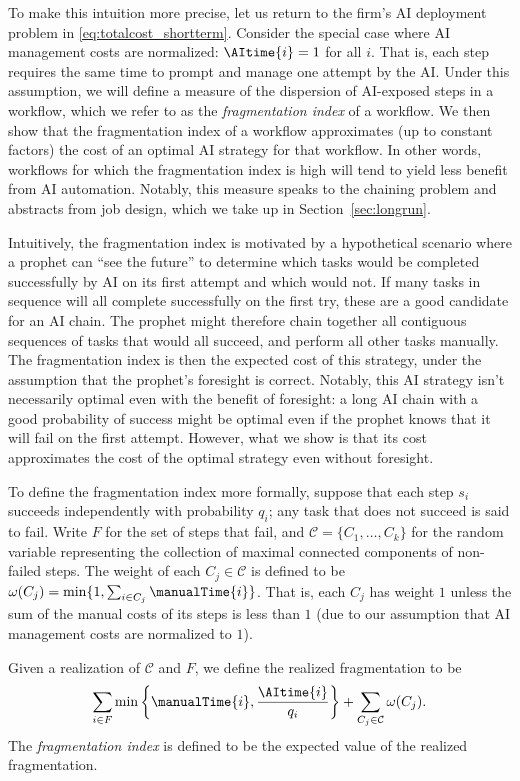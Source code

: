 To make this intuition more precise, let us return to the firm's AI deployment problem in \eqref{eq:totalcost_shortterm}.
Consider the special case where AI management costs are normalized: $\AItime{i} = 1$ for all $i$.
That is, each step requires the same time to prompt and manage one attempt by the AI.
Under this assumption, we will define a measure of the dispersion of AI-exposed steps in a workflow, which we refer to as the \emph{fragmentation index} of a workflow.
We then show that the fragmentation index of a workflow approximates (up to constant factors) the cost of an optimal AI strategy for that workflow.
In other words, workflows for which the fragmentation index is high will tend to yield less benefit from AI automation.
Notably, this measure speaks to the chaining problem and abstracts from job design, which we take up in Section~\ref{sec:longrun}.

Intuitively, the fragmentation index is motivated by a hypothetical scenario where a prophet can ``see the future'' to determine which tasks would be completed successfully by AI on its first attempt and which would not.
If many tasks in sequence will all complete successfully on the first try, these are a good candidate for an AI chain.
The prophet might therefore chain together all contiguous sequences of tasks that would all succeed, and perform all other tasks manually.
The fragmentation index is then the expected cost of this strategy, under the assumption that the prophet's foresight is correct.
Notably, this AI strategy isn't necessarily optimal even with the benefit of foresight: a long AI chain with a good probability of success might be optimal even if the prophet knows that it will fail on the first attempt.
However, what we show is that its cost approximates the cost of the optimal strategy even without foresight.

To define the fragmentation index more formally, suppose that each step $s_i$ succeeds independently with probability $q_i$; any task that does not succeed is said to fail.
Write $F$ for the set of steps that fail, and $\mathcal{C} = \{C_1, \dotsc, C_k\}$ for the random variable representing the collection of maximal connected components of non-failed steps.
The weight of each $C_j \in \mathcal{C}$ is defined to be $\omega(C_j) = \min\{ 1, \sum_{i \in C_j} \manualTime{i} \}$.
That is, each $C_j$ has weight $1$ unless the sum of the manual costs of its steps is less than $1$ (due to our assumption that AI management costs are normalized to $1$).

Given a realization of $\mathcal{C}$ and $F$, we define the realized fragmentation to be
\begin{equation}
    \sum_{i \in F}\min\left\{\manualTime{i}, \frac{\AItime{i}}{q_i}\right\} + \sum_{C_j \in \mathcal{C}} \omega(C_j).\label{eq:fragmentation}
\end{equation}
The \emph{fragmentation index} is defined to be the expected value of the realized fragmentation.

